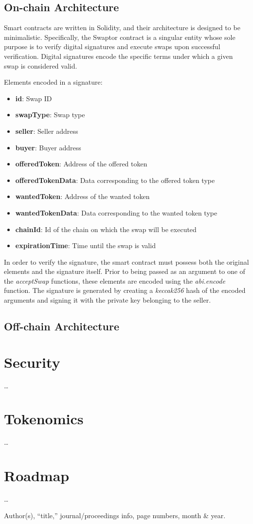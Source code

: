 \documentclass[12pt]{article}
\begin{document}
\subsection{On-chain Architecture}
\indent Smart contracts are written in Solidity, and their architecture is designed to be minimalistic. 
Specifically, the Swaptor contract is a singular entity whose sole purpose is to verify digital signatures 
and execute swaps upon successful verification. Digital signatures encode the specific terms under which a given swap is considered valid.\newline

\noindent Elements encoded in a signature:
\begin{itemize}
  \item \textbf{id}: Swap ID
  \item \textbf{swapType}: Swap type
  \item \textbf{seller}: Seller address
  \item \textbf{buyer}: Buyer address
  \item \textbf{offeredToken}: Address of the offered token
  \item \textbf{offeredTokenData}: Data corresponding to the offered token type
  \item \textbf{wantedToken}: Address of the wanted token
  \item \textbf{wantedTokenData}: Data corresponding to the wanted token type
  \item \textbf{chainId}: Id of the chain on which the swap will be executed
  \item \textbf{expirationTime}: Time until the swap is valid
\end{itemize}

In order to verify the signature, the smart contract must possess both the original elements 
and the signature itself. Prior to being passed as an argument to one of the \textit{acceptSwap} functions, 
these elements are encoded using the \textit{abi.encode} function. The signature is generated by creating a 
\textit{keccak256} hash of the encoded arguments and signing it with the private key belonging to the seller.



\subsection{Off-chain Architecture}

\section{Security} \label{subm}
\dots

\section{Tokenomics}
\dots

\section{Roadmap}
\dots

\begin{thebibliography}{9}
  Author(s), ``title,'' journal/proceedings info, page numbers,
  month \& year.
\end{thebibliography}
\end{document}
